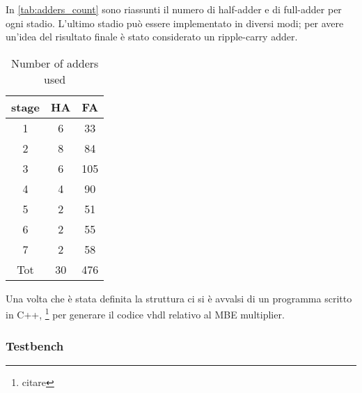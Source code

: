 In \autoref{tab:adders_count} sono riassunti il numero di half-adder e di full-adder per ogni stadio. L'ultimo stadio può essere implementato in diversi modi; per avere un'idea del risultato finale è stato considerato un ripple-carry adder.
\begin{table}[htb]
	\centering
	\begin{tabular}{ccc}
		stage & HA & FA \\ 
		\hline 
		1 & 6 & 33\\ 
		2 & 8 & 84\\ 
		3 & 6 & 105\\ 
		4 & 4 & 90\\ 
		5 & 2 & 51\\ 
		6 & 2 & 55\\ 
		7 & 2 & 58\\ 
		Tot & 30 & 476\\ 
	\end{tabular}  
	\label{tab:adders_count}
	\caption{Number of adders used}
\end{table}
Una volta che è stata definita la struttura ci si è avvalsi di un programma scritto in C++, \footnote{citare} per generare il codice vhdl relativo al MBE multiplier.

\subsubsection{Testbench}
